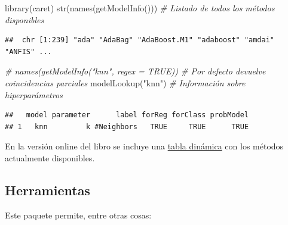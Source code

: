 \documentclass[
]{book}
\newenvironment{Shaded}{\begin{snugshade}}{\end{snugshade}}
\newcommand{\CommentTok}[1]{\textcolor[rgb]{0.56,0.35,0.01}{\textit{#1}}}
\newcommand{\FunctionTok}[1]{\textcolor[rgb]{0.00,0.00,0.00}{#1}}
\newcommand{\NormalTok}[1]{#1}
\newcommand{\StringTok}[1]{\textcolor[rgb]{0.31,0.60,0.02}{#1}}
\theoremstyle{break}
\theoremstyle{definition}
\theoremstyle{definition}
\theoremstyle{definition}
\theoremstyle{definition}
\theoremstyle{remark}
\begin{document}
\begin{Shaded}
\begin{Highlighting}[]
\FunctionTok{library}\NormalTok{(caret)}
\FunctionTok{str}\NormalTok{(}\FunctionTok{names}\NormalTok{(}\FunctionTok{getModelInfo}\NormalTok{())) }\CommentTok{\# Listado de todos los métodos disponibles}
\end{Highlighting}
\end{Shaded}

\begin{verbatim}
##  chr [1:239] "ada" "AdaBag" "AdaBoost.M1" "adaboost" "amdai" "ANFIS" ...
\end{verbatim}

\begin{Shaded}
\begin{Highlighting}[]
\CommentTok{\# names(getModelInfo("knn", regex = TRUE)) \# Por defecto devuelve coincidencias parciales}
\FunctionTok{modelLookup}\NormalTok{(}\StringTok{"knn"}\NormalTok{)  }\CommentTok{\# Información sobre hiperparámetros}
\end{Highlighting}
\end{Shaded}

\begin{verbatim}
##   model parameter      label forReg forClass probModel
## 1   knn         k #Neighbors   TRUE     TRUE      TRUE
\end{verbatim}

En la versión online del libro se incluye una \href{https://rubenfcasal.github.io/aprendizaje_estadistico/caret.html}{tabla dinámica} con los métodos actualmente disponibles.

\hypertarget{herramientas}{%
\subsection{Herramientas}\label{herramientas}}

Este paquete permite, entre otras cosas:
\end{document}
